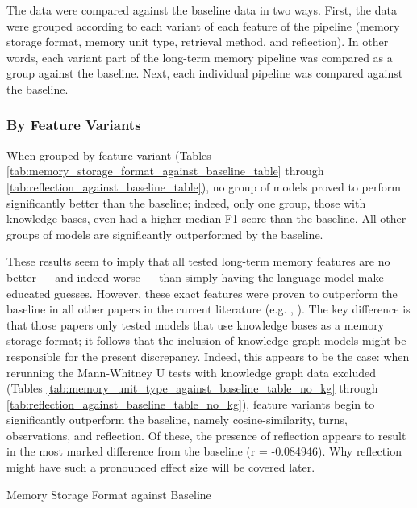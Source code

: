 The data were compared against the baseline data in two ways. First, the data were grouped according to each variant of each feature of the pipeline (memory storage format, memory unit type, retrieval method, and reflection). In other words, each variant part of the long-term memory pipeline was compared as a group against the baseline. Next, each individual pipeline was compared against the baseline.


\subsubsection{By Feature Variants}

When grouped by feature variant (Tables \ref{tab:memory_storage_format_against_baseline_table} through \ref{tab:reflection_against_baseline_table}), no group of models proved to perform significantly better than the baseline; indeed, only one group, those with knowledge bases, even had a higher median F1 score than the baseline. All other groups of models are significantly outperformed by the baseline. 

These results seem to imply that all tested long-term memory features are no better — and indeed worse — than simply having the language model make educated guesses. However, these exact features were proven to outperform the baseline in all other papers in the current literature (e.g. \cite{Maharana2024}, \cite{Li2024}). The key difference is that those papers only tested models that use knowledge bases as a memory storage format; it follows that the inclusion of knowledge graph models might be responsible for the present discrepancy. Indeed, this appears to be the case: when rerunning the Mann-Whitney U tests with knowledge graph data excluded (Tables \ref{tab:memory_unit_type_against_baseline_table_no_kg} through \ref{tab:reflection_against_baseline_table_no_kg}), feature variants begin to significantly outperform the baseline, namely cosine-similarity, turns, observations, and reflection. Of these, the presence of reflection appears to result in the most marked difference from the baseline (r = -0.084946). Why reflection might have such a pronounced effect size will be covered later.

\begin{table}[p]
\centering
\tiny

\caption{Memory Storage Format against Baseline}
\label{tab:memory_storage_format_against_baseline_table}
\end{table}

